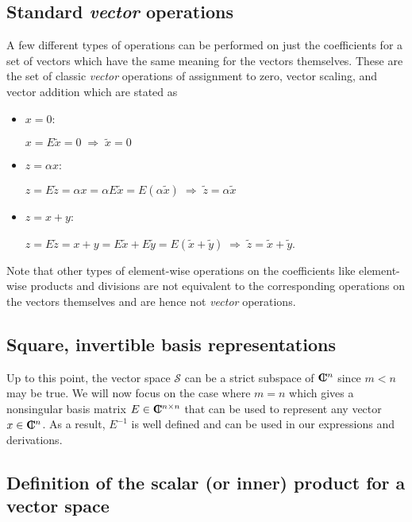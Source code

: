 \documentclass[pdf,ps2pdf,11pt]{SANDreport}
\begin{document}
\subsection{Standard {}\textit{vector} operations}

A few different types of operations can be performed on just the coefficients
for a set of vectors which have the same meaning for the vectors themselves.
These are the set of classic {}\textit{vector} operations of assignment to
zero, vector scaling, and vector addition which are stated as

\begin{itemize}

{}\item $x = 0$:

$x = E \tilde{x} = 0 \; \Rightarrow \; \tilde{x} = 0$ 

{}\item $z = \alpha x$:

$z = E \tilde{z} = \alpha x = \alpha E \tilde{x} = E ( \alpha
\tilde{x} ) \; \Rightarrow \; \tilde{z} = \alpha \tilde{x}$

{}\item $z = x + y$:

$z = E \tilde{z} = x + y = E \tilde{x} + E \tilde{y} = E ( \tilde{x} +
\tilde{y} ) \; \Rightarrow \; \tilde{z} = \tilde{x} + \tilde{y}$.

\end{itemize}

Note that other types of element-wise operations on the coefficients like
element-wise products and divisions are not equivalent to the corresponding
operations on the vectors themselves and are hence not {}\textit{vector}
operations.

\subsection{Square, invertible basis representations}

Up to this point, the vector space $\mathcal{S}$ can be a strict subspace of
$\mbox{\textbf{C}}\hspace{-1.1ex}\mbox{l}\hspace{0.4ex}^n$ since $m < n$ may be true.  We will now focus on the case where $m =
n$ which gives a nonsingular basis matrix $E\in\mbox{\textbf{C}}\hspace{-1.1ex}\mbox{l}\hspace{0.4ex}^{n\times{}n}$ that can be
used to represent any vector $x\in\mbox{\textbf{C}}\hspace{-1.1ex}\mbox{l}\hspace{0.4ex}^n$.  As a result, $E^{-1}$ is well
defined and can be used in our expressions and derivations.

\subsection{Definition of the scalar (or inner) product for a vector space}
\end{document}
